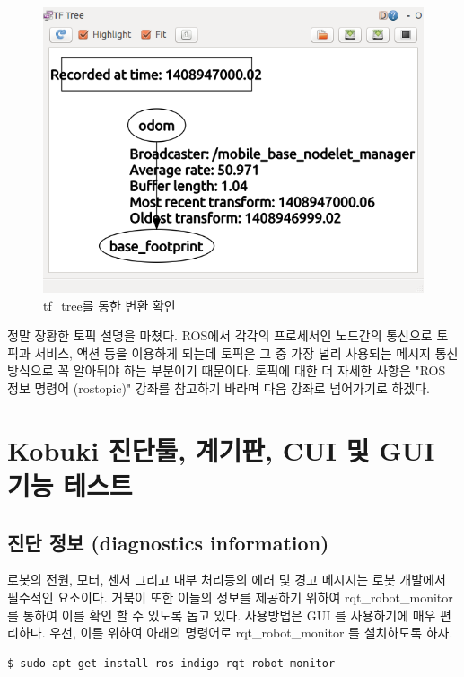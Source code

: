 \begin{figure}[h]
\centering\includegraphics[width=0.8\columnwidth]{pictures/chapter10/rqt_tf_tree_kobuki.png}
\caption{tf\_tree를 통한 변환 확인}
\end{figure}

정말 장황한 토픽 설명을 마쳤다. ROS에서 각각의 프로세서인 노드간의 통신으로 토픽과 서비스, 액션 등을 이용하게 되는데 토픽은 그 중 가장 널리 사용되는 메시지 통신 방식으로 꼭 알아둬야 하는 부분이기 때문이다. 토픽에 대한 더 자세한 사항은 "ROS 정보 명령어 (rostopic)" 강좌를 참고하기 바라며 다음 강좌로 넘어가기로 하겠다.

\section{Kobuki 진단툴, 계기판, CUI 및 GUI 기능 테스트}

\subsection{진단 정보 (diagnostics information)}

로봇의 전원, 모터, 센서 그리고 내부 처리등의 에러 및 경고 메시지는 로봇 개발에서 필수적인 요소이다. 거북이 또한 이들의 정보를 제공하기 위하여  rqt\_robot\_monitor 를 통하여 이를 확인 할 수 있도록 돕고 있다. 사용방법은 GUI 를 사용하기에 매우 편리하다. 우선, 이를 위하여 아래의 명령어로 rqt\_robot\_monitor 를 설치하도록 하자.

\vspace{\baselineskip}
\begin{lstlisting}[language=ROS]
$ sudo apt-get install ros-indigo-rqt-robot-monitor
\end{lstlisting}

